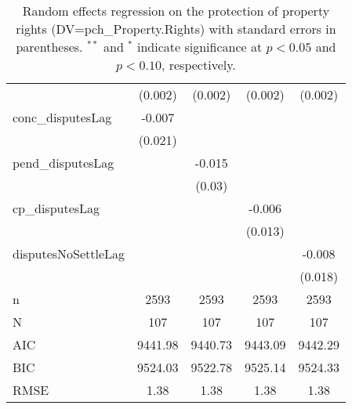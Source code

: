 \begin{table}[ht]
\begin{tabular}{lcccc}
   & (0.002) & (0.002) & (0.002) & (0.002) \\ 
  conc\_disputesLag & -0.007 &  &  &  \\ 
   & (0.021) &  &  &  \\ 
  pend\_disputesLag &  & -0.015 &  &  \\ 
   &  & (0.03) &  &  \\ 
  cp\_disputesLag &  &  & -0.006 &  \\ 
   &  &  & (0.013) &  \\ 
  disputesNoSettleLag &  &  &  & -0.008 \\ 
   &  &  &  & (0.018) \\ 
   \hline
n & 2593 & 2593 & 2593 & 2593 \\ 
  N & 107 & 107 & 107 & 107 \\ 
  AIC & 9441.98 & 9440.73 & 9443.09 & 9442.29 \\ 
  BIC & 9524.03 & 9522.78 & 9525.14 & 9524.33 \\ 
  RMSE & 1.38 & 1.38 & 1.38 & 1.38 \\ 
   \hline
\hline
\end{tabular}
\caption{Random effects regression on the protection of property rights (DV=pch\_Property.Rights) with standard errors in parentheses. $^{**}$ and $^{*}$ indicate significance at $p< 0.05 $ and $p< 0.10 $, respectively.} 
\end{table}
